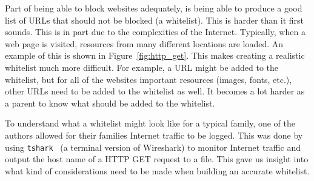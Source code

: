 Part of being able to block websites adequately, is being able to produce a
good list of URLs that should not be blocked (a whitelist). This is harder than
it first sounds. This is in part due to the complexities of the Internet.
Typically, when a web page is visited, resources from many different locations
are loaded. An example of this is shown in Figure~\ref{fig:http_get}. This
makes creating a realistic whitelist much more difficult. For example, a URL
might be added to the whitelist, but for all of the websites important
resources (images, fonts, etc.), other URLs need to be added to the whitelist
as well. It becomes a lot harder as a parent to know what should be added to
the whitelist.

To understand what a whitelist might look like for a typical family, one of the
authors allowed for their families Internet traffic to be logged. This was done
by using \texttt{tshark}~\cite{tshark} (a terminal version of Wireshark) to
monitor Internet traffic and output the host name of a HTTP GET request to a
file. This gave us insight into what kind of considerations need to be made
when building an accurate whitelist.

